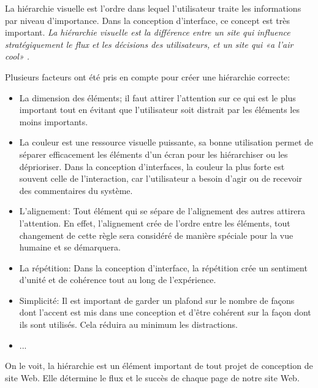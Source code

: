 La hiérarchie visuelle est l'ordre dans lequel l'utilisateur traite les informations par niveau d'importance.
Dans la conception d'interface, ce concept est très important.
\textit{La hiérarchie visuelle est la différence entre un site qui influence stratégiquement le flux et les 
décisions des utilisateurs, et un site qui «a l'air cool» \cite{cao20155}.}
\par 
Plusieurs facteurs ont été pris en compte pour créer une hiérarchie correcte:
\begin{itemize}
        \item La dimension des éléments; il faut attirer l'attention sur ce qui est le plus important
        tout en évitant que l'utilisateur soit distrait par les éléments les moins importants.
        \item La couleur est une ressource visuelle puissante, sa bonne utilisation permet de séparer 
        efficacement les éléments d'un écran pour les hiérarchiser ou les déprioriser. Dans la 
        conception d’interfaces, la couleur la plus forte est souvent celle de l’interaction, 
        car l’utilisateur a besoin d’agir ou de recevoir des commentaires du système.
        \item L'alignement: Tout élément qui se sépare de l'alignement des autres attirera l'attention. 
        En effet, l'alignement crée de l'ordre entre les éléments, tout changement de cette règle sera 
        considéré de manière spéciale pour la vue humaine et se démarquera.
        \item La répétition: Dans la conception d'interface, la répétition crée un sentiment 
        d'unité et de cohérence tout au long de l'expérience.
        \item Simplicité: Il est important de garder un plafond sur le nombre de façons dont l'accent est
         mis dans une conception et d'être cohérent sur la façon dont ils sont utilisés. 
         Cela réduira au minimum les distractions.
        \item ...\cite{design}

\end{itemize}
On le voit, la hiérarchie est un élément important de tout projet de conception de site Web. 
Elle détermine le flux et le succès de chaque page de notre site Web.


